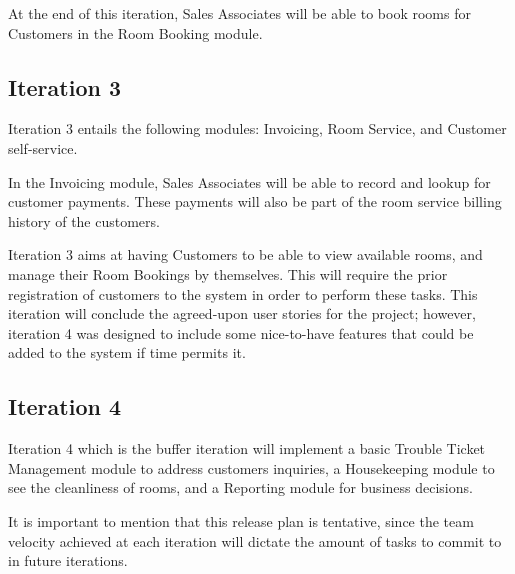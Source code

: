At the end of this iteration, Sales Associates will be able to book rooms for Customers in the Room Booking module.

\subsection{Iteration 3}
Iteration 3 entails the following modules: Invoicing, Room Service, and Customer self-service.

In the Invoicing module, Sales Associates will be able to record and lookup for customer payments. These payments will also be part of the room service billing history of the customers.

Iteration 3 aims at having Customers to be able to view available rooms, and manage their Room Bookings by themselves. This will require the prior registration of customers to the system in order to perform these tasks. This iteration will conclude the agreed-upon user stories for the project; however, iteration 4 was designed to include some nice-to-have features that could be added to the system if time permits it.

\subsection{Iteration 4}
Iteration 4 which is the buffer iteration will implement a basic Trouble Ticket Management module to address customers inquiries, a Housekeeping module to see the cleanliness of rooms, and a Reporting module for business decisions.

It is important to mention that this release plan is tentative, since the team velocity achieved at each iteration will dictate the amount of tasks to commit to in future iterations. 
